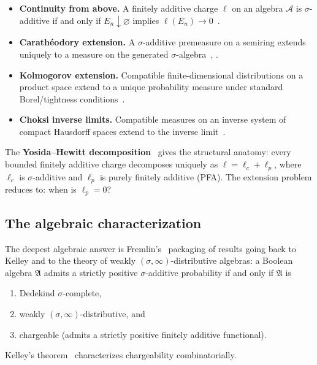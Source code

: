 \begin{itemize}
  \item \textbf{Continuity from above.}  A finitely additive charge
    $\ell$ on an algebra $\mathcal{A}$ is $\sigma$-additive if and
    only if $E_n \downarrow \varnothing$ implies
    $\ell(E_n) \to 0$~\cite[\S13, Theorem~D]{Halmos1950}.

  \item \textbf{Carath\'{e}odory extension.}  A $\sigma$-additive
    premeasure on a semiring extends uniquely to a measure on the
    generated $\sigma$-algebra~\cite[\S13]{Halmos1950},
    \cite[Vol.~1, Ch.~1]{Bogachev2007}.

  \item \textbf{Kolmogorov extension.}  Compatible
    finite-dimensional distributions on a product space extend to a
    unique probability measure under standard Borel/tightness
    conditions~\cite[Ch.~36]{Billingsley1995}.

  \item \textbf{Choksi inverse limits.}  Compatible measures on an
    inverse system of compact Hausdorff spaces extend to the inverse
    limit~\cite[Theorem~1]{Choksi1958}.
\end{itemize}

The \textbf{Yosida--Hewitt decomposition}~\cite{YosidaHewitt1952}
gives the structural anatomy: every bounded finitely additive charge
decomposes uniquely as $\ell = \ell_c + \ell_p$, where $\ell_c$ is
$\sigma$-additive and $\ell_p$ is purely finitely additive (PFA).
The extension problem reduces to: when is $\ell_p = 0$?

\subsection{The algebraic characterization}
\label{sec:kvp}

The deepest algebraic answer is
Fremlin's~\cite[\S391]{Fremlin2003} packaging of results going back
to Kelley and to the theory of weakly
$(\sigma,\infty)$-distributive algebras: a Boolean algebra
$\mathfrak{A}$
admits a strictly positive $\sigma$-additive probability if and only
if $\mathfrak{A}$ is
\begin{enumerate}[label=(\roman*),nosep]
  \item Dedekind $\sigma$-complete,
  \item weakly $(\sigma,\infty)$-distributive, and
  \item chargeable (admits a strictly positive finitely additive
    functional).
\end{enumerate}
Kelley's theorem~\cite[391J]{Fremlin2003} characterizes
chargeability combinatorially.


